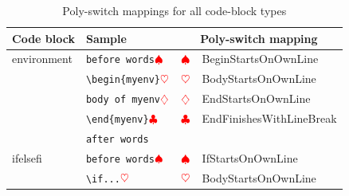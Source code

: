 	\clearpage
	\begin{longtable}{llll}
		\caption{Poly-switch mappings for all code-block types}\label{tab:poly-switch-mapping}                                                                                                                                                  \\
		\toprule
		Code block                                      & Sample                                                                  & \multicolumn{2}{c}{Poly-switch mapping}                                                                     \\
		\midrule
		environment                                     & \verb!before words!$\color{red}\spadesuit$                       & $\color{red}\spadesuit$                 & BeginStartsOnOwnLine                                              \\
		                                                & \verb!\begin{myenv}!$\color{red}\heartsuit$                        & $\color{red}\heartsuit$                  & BodyStartsOnOwnLine                                               \\
		                                                & \verb!body of myenv!$\color{red}\diamondsuit$                         & $\color{red}\diamondsuit$                   & EndStartsOnOwnLine                                                \\
		                                                & \verb!\end{myenv}!$\color{red}\clubsuit$                   & $\color{red}\clubsuit$             & EndFinishesWithLineBreak                                          \\
		                                                & \verb!after words!                                              &                                         &                                                                   \\
		\cmidrule{2-4}
		ifelsefi                                        & \verb!before words!$\color{red}\spadesuit$                       & $\color{red}\spadesuit$                 & IfStartsOnOwnLine                                                 \\
		                                                & \verb!\if...!$\color{red}\heartsuit$                        & $\color{red}\heartsuit$                  & BodyStartsOnOwnLine                                               \\

\end{longtable}
